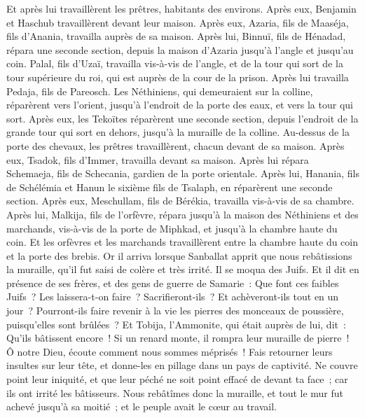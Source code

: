\begin{multicols}{2}
Et après lui travaillèrent les prêtres, habitants des environs.
Après eux, Benjamin et Haschub travaillèrent devant leur maison. Après eux, Azaria, fils de Maaséja, fils d'Anania, travailla auprès de sa maison.
Après lui, Binnuï, fils de Hénadad, répara une seconde section, depuis la maison d'Azaria jusqu'à l'angle et jusqu'au coin.
Palal, fils d'Uzaï, travailla vis-à-vis de l'angle, et de la tour qui sort de la tour supérieure du roi, qui est auprès de la cour de la prison. Après lui travailla Pedaja, fils de Pareosch.
Les Néthiniens, qui demeuraient sur la colline, réparèrent vers l'orient, jusqu'à l'endroit de la porte des eaux, et vers la tour qui sort.
Après eux, les Tekoïtes réparèrent une seconde section, depuis l'endroit de la grande tour qui sort en dehors, jusqu'à la muraille de la colline.
Au-dessus de la porte des chevaux, les prêtres travaillèrent, chacun devant de sa maison.
Après eux, Tsadok, fils d'Immer, travailla devant sa maison. Après lui répara Schemaeja, fils de Schecania, gardien de la porte orientale.
Après lui, Hanania, fils de Schélémia et Hanun le sixième fils de Tsalaph, en réparèrent une seconde section. Après eux, Meschullam, fils de Bérékia, travailla vis-à-vis de sa chambre.
Après lui, Malkija, fils de l'orfèvre, répara jusqu'à la maison des Néthiniens et des marchands, vis-à-vis de la porte de Miphkad, et jusqu'à la chambre haute du coin.
Et les orfèvres et les marchands travaillèrent entre la chambre haute du coin et la porte des brebis.
\VerseOne{}Or il arriva lorsque Sanballat apprit que nous rebâtissions la muraille, qu'il fut saisi de colère et très irrité. Il se moqua des Juifs.
Et il dit en présence de ses frères, et des gens de guerre de Samarie~: Que font ces faibles Juifs~? Les laissera-t-on faire~? Sacrifieront-ils~? Et achèveront-ils tout en un jour~? Pourront-ils faire revenir à la vie les pierres des monceaux de poussière, puisqu'elles sont brûlées~?
Et Tobija, l'Ammonite, qui était auprès de lui, dit~: Qu'ils bâtissent encore~! Si un renard monte, il rompra leur muraille de pierre~!
Ô notre Dieu, écoute comment nous sommes méprisés~! Fais retourner leurs insultes sur leur tête, et donne-les en pillage dans un pays de captivité.
Ne couvre point leur iniquité, et que leur péché ne soit point effacé de devant ta face~; car ils ont irrité les bâtisseurs.
Nous rebâtîmes donc la muraille, et tout le mur fut achevé jusqu'à sa moitié~; et le peuple avait le cœur au travail.

\end{multicols}
